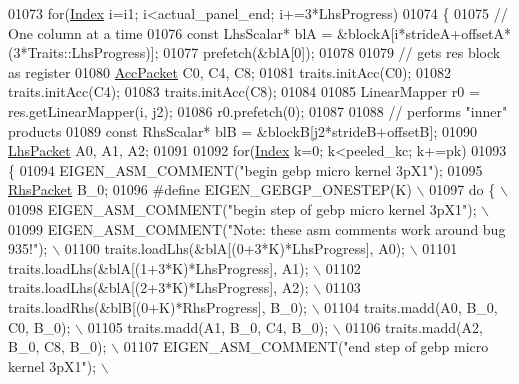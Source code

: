 \begin{DoxyCode}
01073           \textcolor{keywordflow}{for}(\hyperlink{namespace_eigen_a62e77e0933482dafde8fe197d9a2cfde}{Index} i=i1; i<actual\_panel\_end; i+=3*LhsProgress)
01074           \{
01075           \textcolor{comment}{// One column at a time}
01076           \textcolor{keyword}{const} LhsScalar* blA = &blockA[i*strideA+offsetA*(3*Traits::LhsProgress)];
01077           prefetch(&blA[0]);
01078 
01079           \textcolor{comment}{// gets res block as register}
01080           \hyperlink{class_eigen_1_1internal_1_1_tensor_lazy_evaluator_writable}{AccPacket} C0, C4, C8;
01081           traits.initAcc(C0);
01082           traits.initAcc(C4);
01083           traits.initAcc(C8);
01084 
01085           LinearMapper r0 = res.getLinearMapper(i, j2);
01086           r0.prefetch(0);
01087 
01088           \textcolor{comment}{// performs "inner" products}
01089           \textcolor{keyword}{const} RhsScalar* blB = &blockB[j2*strideB+offsetB];
01090           \hyperlink{class_eigen_1_1internal_1_1_tensor_lazy_evaluator_writable}{LhsPacket} A0, A1, A2;
01091           
01092           \textcolor{keywordflow}{for}(\hyperlink{namespace_eigen_a62e77e0933482dafde8fe197d9a2cfde}{Index} k=0; k<peeled\_kc; k+=pk)
01093           \{
01094             EIGEN\_ASM\_COMMENT(\textcolor{stringliteral}{"begin gebp micro kernel 3pX1"});
01095             \hyperlink{class_eigen_1_1internal_1_1_tensor_lazy_evaluator_writable}{RhsPacket} B\_0;
01096 \textcolor{preprocessor}{#define EIGEN\_GEBGP\_ONESTEP(K) \(\backslash\)}
01097 \textcolor{preprocessor}{            do \{ \(\backslash\)}
01098 \textcolor{preprocessor}{              EIGEN\_ASM\_COMMENT("begin step of gebp micro kernel 3pX1"); \(\backslash\)}
01099 \textcolor{preprocessor}{              EIGEN\_ASM\_COMMENT("Note: these asm comments work around bug 935!"); \(\backslash\)}
01100 \textcolor{preprocessor}{              traits.loadLhs(&blA[(0+3*K)*LhsProgress], A0);  \(\backslash\)}
01101 \textcolor{preprocessor}{              traits.loadLhs(&blA[(1+3*K)*LhsProgress], A1);  \(\backslash\)}
01102 \textcolor{preprocessor}{              traits.loadLhs(&blA[(2+3*K)*LhsProgress], A2);  \(\backslash\)}
01103 \textcolor{preprocessor}{              traits.loadRhs(&blB[(0+K)*RhsProgress], B\_0);   \(\backslash\)}
01104 \textcolor{preprocessor}{              traits.madd(A0, B\_0, C0, B\_0); \(\backslash\)}
01105 \textcolor{preprocessor}{              traits.madd(A1, B\_0, C4, B\_0); \(\backslash\)}
01106 \textcolor{preprocessor}{              traits.madd(A2, B\_0, C8, B\_0); \(\backslash\)}
01107 \textcolor{preprocessor}{              EIGEN\_ASM\_COMMENT("end step of gebp micro kernel 3pX1"); \(\backslash\)}

\end{DoxyCode}
